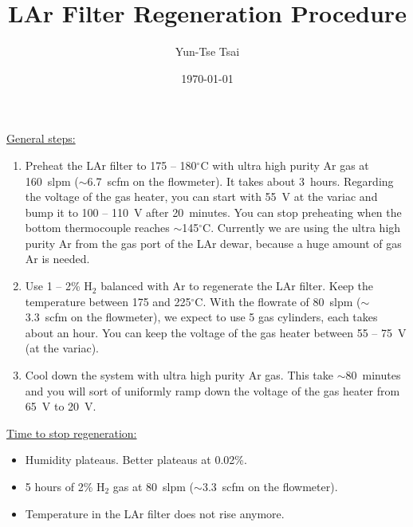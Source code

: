 \documentclass[letterpaper,11pt]{article}
\newcommand{\Hydro}     {H$_2$}
\newcommand{\dC}        {$^\circ$C}
\begin{document}
\title{\textbf{LAr Filter Regeneration Procedure}}
\author{Yun-Tse Tsai}
\date{\today}

\maketitle

\underline{General steps:}
\begin{enumerate}
\setlength\itemsep{-0.2em}
\item Preheat the LAr filter to 175 -- 180{\dC} with ultra high purity Ar gas at 160~slpm ($\sim$6.7~scfm on the flowmeter).  
It takes about 3~hours.  Regarding the voltage of the gas heater, you can start with 55~V at the variac and bump it 
to 100 -- 110~V after 20~minutes.  
You can stop preheating when the bottom thermocouple reaches $\sim$145{\dC}.
Currently we are using the ultra high purity Ar from the gas port of the LAr dewar, because a huge amount of gas Ar
is needed.
\item Use 1 -- 2\% {\Hydro} balanced with Ar to regenerate the LAr filter.  Keep the temperature between 175 and 225{\dC}.  
With the flowrate of 80~slpm ($\sim$3.3~scfm on the flowmeter), we expect to use 5 gas cylinders, 
each takes about an hour.  You can keep the voltage of the gas heater between 55 -- 75~V (at the variac).
\item Cool down the system with ultra high purity Ar gas.  
This take $\sim$80~minutes and you will sort of uniformly ramp down the voltage of the gas heater from 65~V to 20~V.
\end{enumerate}

\underline{Time to stop regeneration:}
\begin{itemize}
\setlength\itemsep{-0.2em}
\item Humidity plateaus.  Better plateaus at 0.02\%.
\item 5 hours of 2\% {\Hydro} gas at 80~slpm ($\sim$3.3~scfm on the flowmeter).
\item Temperature in the LAr filter does not rise anymore.
\end{itemize}
\end{document}
